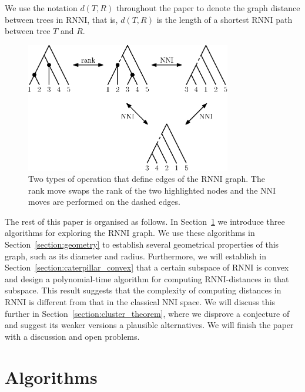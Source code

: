 \documentclass{amsart}
\newcommand{\nni}{\mathrm{NNI}}
\newcommand{\rnni}{\mathrm{RNNI}}
\begin{document}
We use the notation $d(T, R)$ throughout the paper to denote the graph distance between trees in $\rnni$, that is, $d(T, R)$ is the length of a shortest $\rnni$ path between tree $T$ and $R$.

\begin{figure}[H]
\centering
\includegraphics[width=0.8\textwidth]{RNNI}
\vspace{12pt}
\caption{Two types of operation that define edges of the $\rnni$ graph.
The rank move swaps the rank of the two highlighted nodes and the $\nni$ moves are performed on the dashed edges.}
\label{fig:RNNI}
\end{figure}

The rest of this paper is organised as follows.
In Section~\ref{section:algorithms} we introduce three algorithms for exploring the $\rnni$ graph.
We use these algorithms in Section~\ref{section:geometry} to establish several geometrical properties of this graph, such as its diameter and radius.
Furthermore, we will establish in Section~\ref{section:caterpillar_convex} that a certain subspace of $\rnni$ is convex and design a polynomial-time algorithm for computing $\rnni$-distances in that subspace.
This result suggests that the complexity of computing distances in $\rnni$ is different from that in the classical $\nni$ space.
We will discuss this further in Section~\ref{section:cluster_theorem}, where we disprove a conjecture of \textcite{Gavryushkin2018-ol} and suggest its weaker versions a plausible alternatives.
We will finish the paper with a discussion and open problems.


\section{Algorithms}
\label{section:algorithms}
\end{document}
